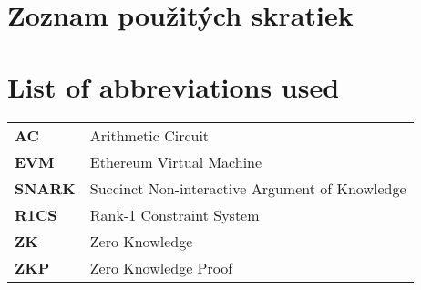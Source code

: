 \thispagestyle{plain}

\ifx\FIITlagEN\undefined
    \section*{\Huge Zoznam použitých skratiek}
\else
    \section*{\Huge List of abbreviations used}
\fi
\vskip 1cm

\begin{tabular}{ >{\bfseries}m{2cm} m{10cm} }
	AC  & Arithmetic Circuit       	\\
	EVM & Ethereum Virtual Machine 	\\
	SNARK & Succinct Non-interactive Argument of Knowledge \\
	R1CS & Rank-1 Constraint System \\
	ZK  & Zero Knowledge           	\\
	ZKP & Zero Knowledge Proof
\end{tabular}

\begin{tabular}{ >{\bfseries}m{2cm} m{10cm} }
\end{tabular}

\emptypage
